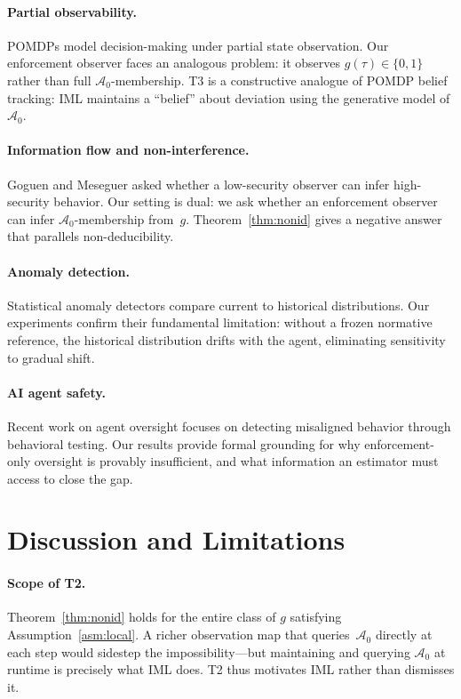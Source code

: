 \documentclass[11pt]{article}
\newcommand{\Azero}{\mathcal{A}_0}
\begin{document}
\paragraph{Partial observability.}
POMDPs \cite{kaelbling1998planning} model decision-making under partial
state observation.  Our enforcement observer faces an analogous problem:
it observes $g(\tau) \in \{0,1\}$ rather than full $\Azero$-membership.
T3 is a constructive analogue of POMDP belief tracking: IML maintains a
``belief'' about deviation using the generative model of $\Azero$.

\paragraph{Information flow and non-interference.}
Goguen and Meseguer \cite{goguen1982security} asked whether a low-security
observer can infer high-security behavior.  Our setting is dual: we ask
whether an enforcement observer can infer $\Azero$-membership from~$g$.
Theorem~\ref{thm:nonid} gives a negative answer that parallels non-deducibility.

\paragraph{Anomaly detection.}
Statistical anomaly detectors \cite{chandola2009anomaly} compare current to
historical distributions.  Our experiments confirm their fundamental limitation:
without a frozen normative reference, the historical distribution drifts with
the agent, eliminating sensitivity to gradual shift.

\paragraph{AI agent safety.}
Recent work on agent oversight \cite{greenblatt2024ai,perez2022red} focuses
on detecting misaligned behavior through behavioral testing.  Our results
provide formal grounding for why enforcement-only oversight is provably
insufficient, and what information an estimator must access to close the gap.

\section{Discussion and Limitations}
\label{sec:discussion}

\paragraph{Scope of T2.}
Theorem~\ref{thm:nonid} holds for the entire class of $g$ satisfying
Assumption~\ref{asm:local}.  A richer observation map that queries~$\Azero$
directly at each step would sidestep the impossibility---but maintaining and
querying $\Azero$ at runtime is precisely what IML does.  T2 thus motivates
IML rather than dismisses it.
\end{document}
